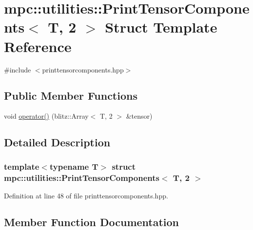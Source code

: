 \hypertarget{structmpc_1_1utilities_1_1_print_tensor_components_3_01_t_00_012_01_4}{}\section{mpc\+:\+:utilities\+:\+:Print\+Tensor\+Components$<$ T, 2 $>$ Struct Template Reference}
\label{structmpc_1_1utilities_1_1_print_tensor_components_3_01_t_00_012_01_4}


{\ttfamily \#include $<$printtensorcomponents.\+hpp$>$}

\subsection*{Public Member Functions}
\begin{DoxyCompactItemize}
\item 
void \mbox{\hyperlink{structmpc_1_1utilities_1_1_print_tensor_components_3_01_t_00_012_01_4_ac0b613c8830faa23f0e44f63ac49adb8}{operator()}} (blitz\+::\+Array$<$ T, 2 $>$ \&tensor)
\end{DoxyCompactItemize}


\subsection{Detailed Description}
\subsubsection*{template$<$typename T$>$\newline
struct mpc\+::utilities\+::\+Print\+Tensor\+Components$<$ T, 2 $>$}



Definition at line 48 of file printtensorcomponents.\+hpp.



\subsection{Member Function Documentation}
\mbox{\label{structmpc_1_1utilities_1_1_print_tensor_components_3_01_t_00_012_01_4_ac0b613c8830faa23f0e44f63ac49adb8}} 

